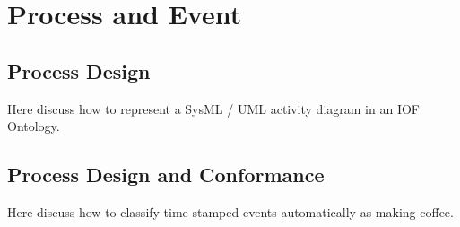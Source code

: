 \chapter{Process and Event}

\section*{Process Design}
Here discuss how to represent a SysML / UML activity diagram in an IOF Ontology.
\section*{Process Design and Conformance}
 Here discuss how to classify time stamped events automatically as making coffee.
